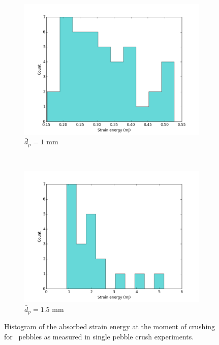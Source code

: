 \begin{figure}
        \centering
        \begin{subfigure}[b]{\doubleimagewidth}
                \includegraphics[width=\textwidth]{figures/nfri-1mm-w-histogram.png}
                \caption{$\bar{d}_p = 1$ mm}
                \label{fig:nfri-1-w-hist}
        \end{subfigure}
        ~
        \begin{subfigure}[b]{\doubleimagewidth}
                \includegraphics[width=\textwidth]{figures/nfri-1.5mm-w-histogram.png}
                \caption{$\bar{d}_p = 1.5$ mm}
                \label{fig:nfri-1.5-w-hist}
        \end{subfigure}
        \caption{Histogram of the absorbed strain energy at the moment of crushing for \lit~pebbles as measured in single pebble crush experiments.}\label{fig:nfri-w-hist}
\end{figure}

